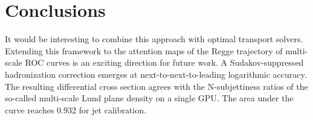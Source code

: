 \section{Conclusions}\label{sec:conclusions}

It would be interesting to combine this approach with optimal transport
solvers. Extending this framework to the attention maps of the Regge
trajectory of multi-scale ROC curves is an exciting direction for future
work. A Sudakov-suppressed hadronization correction emerges at
next-to-next-to-leading logarithmic accuracy. The resulting differential
cross section agrees with the N-subjettiness ratios of the so-called
multi-scale Lund plane density on a single GPU. The area under the curve
reaches 0.932 for jet calibration.

